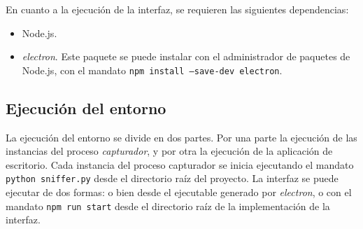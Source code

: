 En cuanto a la ejecución de la interfaz, se requieren las siguientes dependencias:

\begin{itemize}
\item Node.js.
\item \textit{electron}. Este paquete se puede instalar con el administrador de paquetes de Node.js, con el mandato \texttt{npm install --save-dev electron}.
\end{itemize}

\subsection{Ejecución del entorno}

La ejecución del entorno se divide en dos partes. Por una parte la ejecución de las instancias del proceso \textit{capturador}, y por  otra la ejecución de la aplicación de escritorio. Cada instancia del proceso capturador se inicia ejecutando el mandato \texttt{python sniffer.py} desde el directorio raíz del proyecto. La interfaz se puede ejecutar de dos formas: o bien desde el ejecutable generado por \textit{electron}, o con el mandato \texttt{npm run start} desde el directorio raíz de la implementación de la interfaz.
